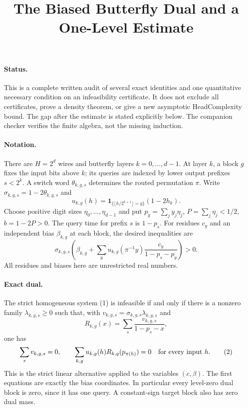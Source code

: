 \documentclass[11pt]{article}
\title{The Biased Butterfly Dual and a One-Level Estimate}
\author{}\date{}
\begin{document}
\maketitle

\paragraph{Status.}
This is a complete written audit of several exact identities and one
quantitative necessary condition on an infeasibility certificate. It
does not exclude all certificates, prove a density theorem, or give a
new asymptotic HeadComplexity bound. The gap after the estimate is stated
explicitly below. The companion checker verifies the finite algebra,
not the missing induction.

\paragraph{Notation.}
There are $H=2^d$ wires and butterfly layers $k=0,\ldots,d-1$.
At layer $k$, a block $g$ fixes the input bits above $k$; its queries
are indexed by lower output prefixes $s<2^k$. A switch word
$\theta_{k,g,s}$ determines the routed permutation $\pi$.
Write $\sigma_{k,g,s}=1-2\theta_{k,g,s}$ and
\[
 u_{k,g}(h)=\mathbf1_{\{\lfloor h/2^{k+1}\rfloor=g\}}
             (1-2h_k).
\]
Choose positive digit sizes $\eta_0,\ldots,\eta_{d-1}$ and put
$p_y=\sum_j y_j\eta_j$, $P=\sum_j\eta_j<1/2$,
$b=1-2P>0$. The query time for prefix $s$ is $1-p_s$.
For residues $c_y$ and an independent bias $\beta_{k,g}$ at each block,
the desired inequalities are
\[
 \sigma_{k,g,s}\left(\beta_{k,g}+
 \sum_y u_{k,g}(\pi^{-1}y)\frac{c_y}{1-p_s-p_y}\right)>0.
 \tag{1}
\]
All residues and biases here are unrestricted real numbers.

\paragraph{Exact dual.}
The strict homogeneous system (1) is infeasible if and only if there is
a nonzero family $\lambda_{k,g,s}\geq0$ such that, with
$v_{k,g,s}=\sigma_{k,g,s}\lambda_{k,g,s}$ and
\[
 R_{k,g}(x)=\sum_s\frac{v_{k,g,s}}{1-p_s-x},
\]
one has
\[
 \sum_s v_{k,g,s}=0,\qquad
 \sum_{k,g}u_{k,g}(h)R_{k,g}(p_{\pi(h)})=0
       \quad\hbox{for every input }h.                 \tag{2}
\]
This is the strict linear alternative applied to the variables
$(c,\beta)$. The first equations are exactly the bias coordinates.
In particular every level-zero dual block is zero, since it has one
query. A constant-sign target block also has zero dual mass.
\end{document}
